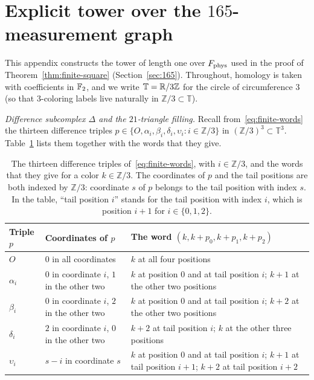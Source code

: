 \section{Explicit tower over the \texorpdfstring{$165$}{165}-measurement graph}\label{app:finite}

This appendix constructs the tower of length one over $F_{\rm phys}$ used in the proof of Theorem~\ref{thm:finite-square} (Section~\ref{sec:165}). Throughout, homology is taken with coefficients in $\mathbb F_2$, and we write $\mathbb T=\mathbb R/3\mathbb Z$ for the circle of circumference $3$ (so that $3$-coloring labels live naturally in $\mathbb Z/3\subset\mathbb T$).

\emph{Difference subcomplex $\Delta$ and the $21$-triangle filling.} Recall from~\eqref{eq:finite-words} the thirteen difference triples $p\in\{O,\alpha_i,\beta_i,\delta_i,\upsilon_i:i\in\mathbb Z/3\}$ in $(\mathbb Z/3)^3\subset\mathbb T^3$. Table~\ref{tab:triples} lists them together with the words that they give.

\begin{table}[htbp]
\centering
\small
\begin{tabular}{@{}l>{\raggedright\arraybackslash}p{3.5cm}>{\raggedright\arraybackslash}p{8.7cm}@{}}
\toprule
Triple $p$ & Coordinates of $p$ & The word $(k,k+p_0,k+p_1,k+p_2)$ \\
\midrule
$O$ & $0$ in all coordinates & $k$ at all four positions \\
$\alpha_i$ & $0$ in coordinate $i$, $1$ in the other two & $k$ at position $0$ and at tail position $i$; $k+1$ at the other two positions \\
$\beta_i$ & $0$ in coordinate $i$, $2$ in the other two & $k$ at position $0$ and at tail position $i$; $k+2$ at the other two positions \\
$\delta_i$ & $2$ in coordinate $i$, $0$ in the other two & $k+2$ at tail position $i$; $k$ at the other three positions \\
$\upsilon_i$ & $s-i$ in coordinate $s$ & $k$ at position $0$ and at tail position $i$; $k+1$ at tail position $i+1$; $k+2$ at tail position $i+2$ \\
\bottomrule
\end{tabular}
\caption{The thirteen difference triples of~\eqref{eq:finite-words}, with $i\in\mathbb Z/3$, and the words that they give for a color $k\in\mathbb Z/3$. The coordinates of $p$ and the tail positions are both indexed by $\mathbb Z/3$: coordinate $s$ of $p$ belongs to the tail position with index $s$. In the table, ``tail position $i$'' stands for the tail position with index $i$, which is position $i+1$ for $i\in\{0,1,2\}$.}
\label{tab:triples}
\end{table}

